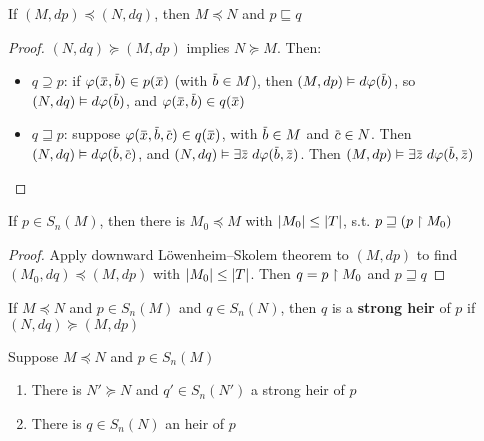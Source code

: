 \documentclass[11pt]{article}
\begin{document}
\begin{lemma}[]
If \((M,dp)\preceq(N,dq)\), then \(M\preceq N\) and \(p\sqsubseteq q\)
\end{lemma}

\begin{proof}
\((N,dq)\succeq(M,dp)\) implies \(N\succeq M\). Then:
\begin{itemize}
\item \(q\supseteq p\): if \(\varphi(\barx,\barb)\in p(\barx)\) (with \(\barb\in M\)), then \((M,dp)\vDash d\varphi(\barb)\),
so \((N,dq)\vDash d\varphi(\barb)\), and \(\varphi(\barx,\barb)\in q(\barx)\)
\item \(q\sqsupseteq p\): suppose \(\varphi(\barx,\barb,\barc)\in q(\barx)\), with \(\barb\in M\) and \(\barc\in N\).
Then \((N,dq)\vDash d\varphi(\barb,\barc)\), and \((N,dq)\vDash\exists\barz\;d\varphi(\barb,\barz)\).
Then \((M,dp)\vDash\exists\barz\;d\varphi(\barb,\barz)\)
\end{itemize}
\end{proof}

\begin{corollary}[]
If \(p\in S_n(M)\), then there is \(M_0\preceq M\) with \(\abs{M_0}\le\abs{T}\), s.t. \(p\sqsupseteq(p\upharpoonright M_0)\)
\end{corollary}

\begin{proof}
Apply downward Löwenheim–Skolem theorem to \((M,dp)\) to find \((M_0,dq)\preceq(M,dp)\)
with \(\abs{M_0}\le\abs{T}\). Then \(q=p\upharpoonright M_0\) and \(p\sqsupseteq q\)
\end{proof}

\begin{definition}[]
If \(M\preceq N\) and \(p\in S_n(M)\) and \(q\in S_n(N)\), then \(q\) is a \textbf{strong heir} of \(p\) if \((N,dq)\succeq(M,dp)\)
\end{definition}

\begin{proposition}
Suppose \(M\preceq N\) and \(p\in S_n(M)\)
\begin{enumerate}
\item There is \(N'\succeq N\) and \(q'\in S_n(N')\) a strong heir of \(p\)
\item There is \(q\in S_n(N)\) an heir of \(p\)
\end{enumerate}
\end{proposition}
\end{document}
